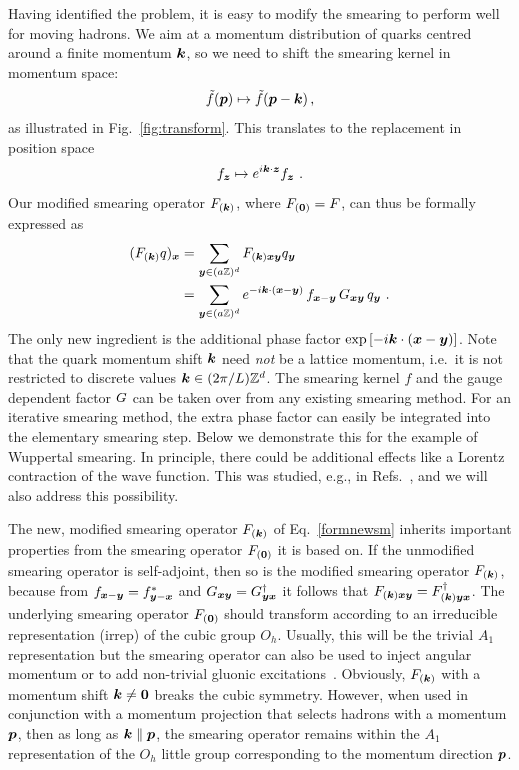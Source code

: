 Having identified the problem, it is easy to modify the smearing to perform well for moving hadrons.
We aim at a momentum distribution of quarks centred around a finite momentum $\boldsymbol{k}$, so we need to shift the smearing kernel in momentum space:
\begin{equation}
	\tilde{f}(\boldsymbol{p}) \mapsto  \tilde{f}(\boldsymbol{p} - \boldsymbol{k}) \label{kerfourshift}\,,
\end{equation}
as illustrated in Fig.~\ref{fig:transform}.
This translates to the replacement in position space
\begin{equation}
	f_{\boldsymbol{z}} \mapsto e^{i\boldsymbol{k}\cdot\boldsymbol{z}} f_{\boldsymbol{z}} \ .
\end{equation}
Our modified smearing operator $F_{(\boldsymbol{k})}$, where $F_{(\boldsymbol{0})}=F$,
can thus be formally expressed as
\begin{align}
	(F_{(\boldsymbol{k})} q)_{\boldsymbol{x}} &= \sum_{\boldsymbol{y}\in (a \mathbb{Z})^d} F_{(\boldsymbol{k})\boldsymbol{x}\boldsymbol{y}} q_{\boldsymbol{y}}\nonumber\\&= 
	\sum_{\boldsymbol{y}\in (a \mathbb{Z})^d} e^{-i\boldsymbol{k}\cdot(\boldsymbol{x}-\boldsymbol{y})}\, f_{\boldsymbol{x}-\boldsymbol{y}}\, G_{\boldsymbol{x}\boldsymbol{y}}\, q_{\boldsymbol{y}} \label{formnewsm}\ .
\end{align}
The only new ingredient is the additional
phase factor $\exp\left[-i\boldsymbol{k}\cdot(\boldsymbol{x}-\boldsymbol{y})\right]$.
Note that the quark momentum shift
$\boldsymbol{k}$ need \emph{not} be a lattice momentum, i.e.\ it is not restricted to discrete values $\boldsymbol{k}\in(2\pi/L)\mathbb{Z}^d$. The smearing kernel $f$
and the gauge dependent factor $G$ can be taken over from any existing smearing method. For an iterative smearing method,
the extra phase factor can easily be integrated into the elementary smearing step. Below we demonstrate this for the
example of Wuppertal smearing.
In principle, there could be additional effects
like a Lorentz contraction of the wave function. This
was studied, e.g., in Refs.~\cite{Roberts:2012tp,DellaMorte:2012xc},
and we will also address this possibility.

The new, modified smearing operator $F_{(\boldsymbol{k})}$ of Eq.~\eqref{formnewsm} inherits important properties
from the smearing operator $F_{(\boldsymbol{0})}$ it is based on.
If the unmodified smearing operator is self-adjoint, then so is the modified smearing operator $F_{(\boldsymbol{k})}$,
because from $f_{\boldsymbol{x}-\boldsymbol{y}} = f_{\boldsymbol{y}-\boldsymbol{x}}^*$ and $G_{\boldsymbol{x}\boldsymbol{y}} = G^\dagger_{\boldsymbol{y}\boldsymbol{x}}$ it follows that
$F_{(\boldsymbol{k})\boldsymbol{x}\boldsymbol{y}} = F^\dagger_{(\boldsymbol{k})\boldsymbol{y}\boldsymbol{x}}$.
The underlying smearing operator $F_{(\boldsymbol{0})}$ should transform according to an irreducible representation (irrep) of the cubic group $O_h$.
Usually, this will be the trivial $A_1$ representation
but the smearing operator can also be used to inject angular momentum
or to add non-trivial gluonic excitations~\cite{Lacock:1994qx}.
Obviously, $F_{(\boldsymbol{k})}$ with a momentum shift $\boldsymbol{k}\neq\boldsymbol{0}$
breaks the cubic symmetry. However, when used in conjunction 
with a momentum projection that selects hadrons with a momentum $\boldsymbol{p}$, then as long
as $\boldsymbol{k}\parallel \boldsymbol{p}$, the smearing operator remains within the
$A_1$ representation of the $O_h$ little group corresponding to
the momentum direction $\boldsymbol{p}$.

